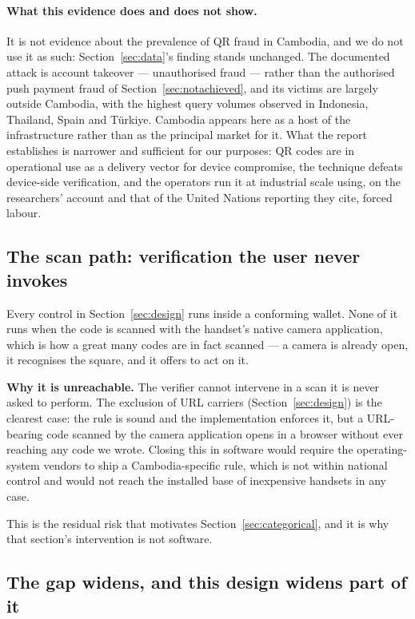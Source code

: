 \documentclass[10pt,a4paper,twocolumn]{article}
\begin{document}
\paragraph{What this evidence does and does not show.}
It is not evidence about the prevalence of QR fraud in Cambodia, and we do not
use it as such: Section~\ref{sec:data}'s finding stands unchanged. The documented
attack is account takeover --- unauthorised fraud --- rather than the authorised
push payment fraud of Section~\ref{sec:notachieved}, and its victims are
largely outside Cambodia, with the highest query volumes observed in Indonesia,
Thailand, Spain and T\"urkiye. Cambodia appears here as a host of the
infrastructure rather than as the principal market for it. What the report
establishes is narrower and sufficient for our purposes: QR codes are in
operational use as a delivery vector for device compromise, the technique
defeats device-side verification, and the operators run it at industrial scale
using, on the researchers' account and that of the United Nations reporting they
cite, forced labour.

\subsection{The scan path: verification the user never invokes}
\label{sec:scanpath}

Every control in Section~\ref{sec:design} runs inside a conforming wallet. None
of it runs when the code is scanned with the handset's native camera
application, which is how a great many codes are in fact scanned --- a camera is
already open, it recognises the square, and it offers to act on it.

\textbf{Why it is unreachable.} The verifier cannot intervene in a scan it is
never asked to perform. The exclusion of URL carriers
(Section~\ref{sec:design}) is the clearest case: the rule is sound and the
implementation enforces it, but a URL-bearing code scanned by the camera
application opens in a browser without ever reaching any code we wrote. Closing
this in software would require the operating-system vendors to ship a
Cambodia-specific rule, which is not within national control and would not reach
the installed base of inexpensive handsets in any case.

This is the residual risk that motivates
Section~\ref{sec:categorical}, and it is why that section's intervention is not
software.

\subsection{The gap widens, and this design widens part of it}
\label{sec:trajectory}
\end{document}
